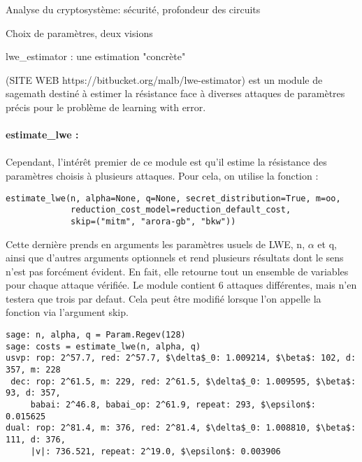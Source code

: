 \begin{section}{Analyse du cryptosystème: sécurité, profondeur des circuits}
\begin{subsection}{Choix de paramètres, deux visions}
	\begin{subsubsection}{lwe\_estimator : une estimation "concrète"}
	
	 (SITE WEB https://bitbucket.org/malb/lwe-estimator) est un module de sagemath
	destiné à estimer la résistance face à diverses attaques de paramètres précis pour
	le problème de learning with error.
	
	
	\paragraph{}
	\textbf{estimate\_lwe :}

	\paragraph{}
	Cependant, l'intérêt premier de ce module est qu'il estime la résistance des paramètres choisis à
	plusieurs attaques. Pour cela, on utilise la fonction  :
	
	\flushleft
	
	\begin{lstlisting}
estimate_lwe(n, alpha=None, q=None, secret_distribution=True, m=oo,
             reduction_cost_model=reduction_default_cost,
             skip=("mitm", "arora-gb", "bkw"))
        \end{lstlisting}
	
	\flushleft
	
	Cette dernière prends en arguments les paramètres usuels de LWE, n, $\alpha$ et q, ainsi que
	d'autres arguments optionnels et rend plusieurs résultats dont le sens n'est pas forcément évident.
	En fait, elle retourne tout un ensemble de variables pour chaque attaque vérifiée. Le module
	contient 6 attaques différentes, mais n'en testera que trois par defaut. Cela peut être modifié
	lorsque l'on appelle la fonction  via l'argument skip.
	
	\flushleft
	
	\begin{lstlisting}[mathescape=true]
sage: n, alpha, q = Param.Regev(128)
sage: costs = estimate_lwe(n, alpha, q)
usvp: rop: 2^57.7, red: 2^57.7, $\delta$_0: 1.009214, $\beta$: 102, d: 357, m: 228
 dec: rop: 2^61.5, m: 229, red: 2^61.5, $\delta$_0: 1.009595, $\beta$: 93, d: 357,
     babai: 2^46.8, babai_op: 2^61.9, repeat: 293, $\epsilon$: 0.015625
dual: rop: 2^81.4, m: 376, red: 2^81.4, $\delta$_0: 1.008810, $\beta$: 111, d: 376,
     |v|: 736.521, repeat: 2^19.0, $\epsilon$: 0.003906
	\end{lstlisting}


\end{subsubsection}
\end{subsection}
\end{section}
